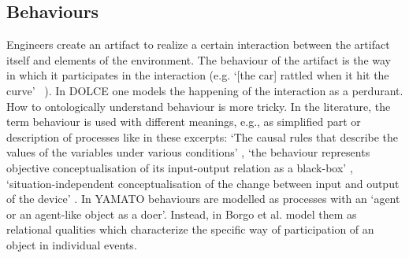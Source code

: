 \documentclass[sw]{iosart2x}
\newcommand{\DOLCE}{\textsc{DOLCE}\xspace} %
\newcommand{\YAMATO}{\textsc{YAMATO}\xspace}
\newcommand{\quotes}[1]{`#1'}
\newcommand{\TODO}[1]{{%
}}
\begin{document}



\subsection{Behaviours}
Engineers create an artifact to realize a certain interaction between the artifact itself and elements of the environment. The behaviour of the artifact is the way in which it participates in the interaction (e.g. \quotes{[the car] rattled when it hit the curve} ~\cite{chandrasekaranFunctionDeviceRepresentation2000}). 
In \DOLCE one models the happening of the interaction as a perdurant. How to ontologically understand behaviour is more tricky. 
In the literature, the term behaviour is used with different meanings, e.g., as simplified part or description of processes like in these excerpts: \quotes{The causal rules that describe the values of the variables under various conditions} \cite{chandrasekaranFunctionDeviceRepresentation2000}, \quotes{the behaviour represents objective conceptualisation of its input-output relation as a black-box} \cite{kitamuraOntologicalModelDevice2006}, \quotes{situation-independent conceptualisation of the change between input and output of the device} \cite{mizoguchiFunctionalOntologyArtifacts2009}. 
In \YAMATO \cite{Mizoguchi2017YAMATOYA} behaviours are modelled as processes with an \quotes{agent or an agent-like object as a doer}. 
Instead, in \cite{borgoFormalOntologicalPerspective2009} Borgo et al.  model them as relational qualities which characterize the specific way of participation of an object in individual events. 
\end{document}
